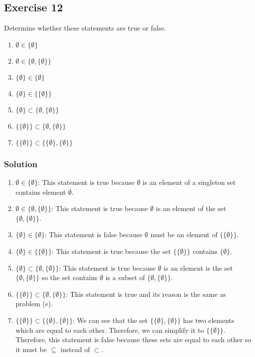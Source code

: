 \documentclass{article}
\theoremstyle{mytheoremstyle}
\theoremstyle{mytheoremstyle}
\theoremstyle{myproblemstyle}
\begin{document}
    \subsection*{Exercise 12}
        Determine whether these statements are true or false.
        \begin{enumerate} [label = (\alph*)]
            \item $ \emptyset \in \{\emptyset\} $
            \item $ \emptyset \in \{\emptyset,\{\emptyset\}\} $
            \item $ \{\emptyset\} \in \{\emptyset\} $
            \item $ \{\emptyset\} \in \{\{\emptyset\}\} $
            \item $ \{\emptyset\} \subset \{\emptyset, \{\emptyset\}\} $
            \item $ \{\{\emptyset\}\} \subset \{\emptyset, \{\emptyset\}\} $
            \item $ \{\{\emptyset\}\} \subset \{\{\emptyset\}, \{\emptyset\}\} $
        \end{enumerate}
    \subsubsection*{Solution}
        \begin{enumerate} [label = (\alph*)]
            \item \(\emptyset \in \{\emptyset\}\): This statement is true
            because \(\emptyset\) is an element of a singleton set contains 
            element \(\emptyset\).
            \item \(\emptyset \in \{\emptyset,\{\emptyset\}\}\): This statement
            is true because \(\emptyset\) is an element of the set 
            $\{\emptyset,\{\emptyset\}\}$.
            \item $ \{\emptyset\} \in \{\emptyset\} $: This statement is false
            because \(\emptyset\) must be an element of \(\{\{\emptyset\}\}\).
            \item $ \{\emptyset\} \in \{\{\emptyset\}\} $: This statement is true
            because the set \(\{\{\emptyset\}\}\) contains \(\{\emptyset\}\).
            \item $ \{\emptyset\} \subset \{\emptyset, \{\emptyset\}\} $: This
            statement is true because \(\emptyset\) is an element is the set \(\{\emptyset, \{\emptyset\}\}\)
            so the set contains \(\emptyset\) is a subset of $\{\emptyset, \{\emptyset\}\}$.
            \item $ \{\{\emptyset\}\} \subset \{\emptyset, \{\emptyset\}\} $: This
            statement is true and its reason is the same as problem (e).
            \item $ \{\{\emptyset\}\} \subset \{\{\emptyset\}, \{\emptyset\}\} $:
            We can see that the set $\{\{\emptyset\}, \{\emptyset\}\}$ has two elements which
            are equal to each other. Therefore, we can simplify it to \(\{\{\emptyset\}\}\).
            Therefore, this statement is false because these sets are equal to each other so
            it must be \(\subseteq\) instead of \(\subset\).
        \end{enumerate}
\end{document}
